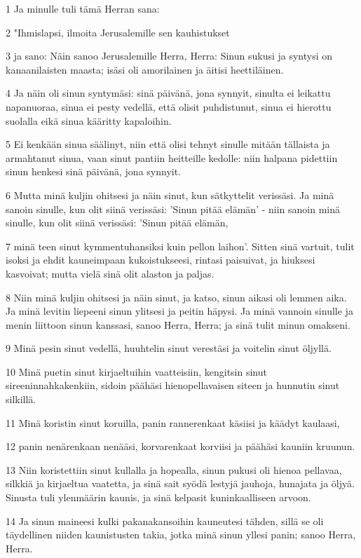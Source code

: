 \par 1 Ja minulle tuli tämä Herran sana:
\par 2 "Ihmislapsi, ilmoita Jerusalemille sen kauhistukset
\par 3 ja sano: Näin sanoo Jerusalemille Herra, Herra: Sinun sukusi ja syntysi on kanaanilaisten maasta; isäsi oli amorilainen ja äitisi heettiläinen.
\par 4 Ja näin oli sinun syntymäsi: sinä päivänä, jona synnyit, sinulta ei leikattu napanuoraa, sinua ei pesty vedellä, että olisit puhdistunut, sinua ei hierottu suolalla eikä sinua kääritty kapaloihin.
\par 5 Ei kenkään sinua säälinyt, niin että olisi tehnyt sinulle mitään tällaista ja armahtanut sinua, vaan sinut pantiin heitteille kedolle: niin halpana pidettiin sinun henkesi sinä päivänä, jona synnyit.
\par 6 Mutta minä kuljin ohitsesi ja näin sinut, kun sätkyttelit verissäsi. Ja minä sanoin sinulle, kun olit siinä verissäsi: 'Sinun pitää elämän' - niin sanoin minä sinulle, kun olit siinä verissäsi: 'Sinun pitää elämän,
\par 7 minä teen sinut kymmentuhansiksi kuin pellon laihon'. Sitten sinä vartuit, tulit isoksi ja ehdit kauneimpaan kukoistukseesi, rintasi paisuivat, ja hiuksesi kasvoivat; mutta vielä sinä olit alaston ja paljas.
\par 8 Niin minä kuljin ohitsesi ja näin sinut, ja katso, sinun aikasi oli lemmen aika. Ja minä levitin liepeeni sinun ylitsesi ja peitin häpysi. Ja minä vannoin sinulle ja menin liittoon sinun kanssasi, sanoo Herra, Herra; ja sinä tulit minun omakseni.
\par 9 Minä pesin sinut vedellä, huuhtelin sinut verestäsi ja voitelin sinut öljyllä.
\par 10 Minä puetin sinut kirjaeltuihin vaatteisiin, kengitsin sinut sireeninnahkakenkiin, sidoin päähäsi hienopellavaisen siteen ja hunnutin sinut silkillä.
\par 11 Minä koristin sinut koruilla, panin rannerenkaat käsiisi ja käädyt kaulaasi,
\par 12 panin nenärenkaan nenääsi, korvarenkaat korviisi ja päähäsi kauniin kruunun.
\par 13 Niin koristettiin sinut kullalla ja hopealla, sinun pukusi oli hienoa pellavaa, silkkiä ja kirjaeltua vaatetta, ja sinä sait syödä lestyjä jauhoja, hunajata ja öljyä. Sinusta tuli ylenmäärin kaunis, ja sinä kelpasit kuninkaalliseen arvoon.
\par 14 Ja sinun maineesi kulki pakanakansoihin kauneutesi tähden, sillä se oli täydellinen niiden kaunistusten takia, jotka minä sinun yllesi panin; sanoo Herra, Herra.
